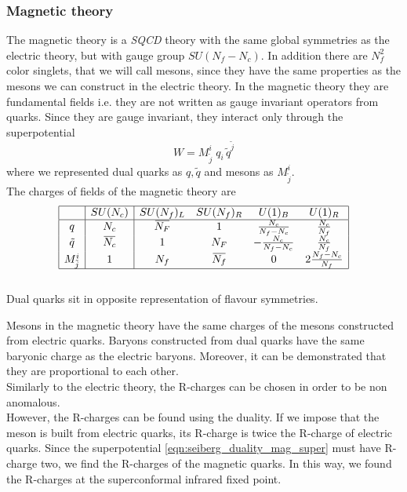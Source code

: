 \subsubsection{Magnetic theory}
The magnetic theory is a \emph{SQCD} theory with the same global symmetries as the electric theory, but with gauge group $SU(N_f - N_c)$. 
In addition there are $N_f^2$ color singlets, that we will call mesons, since they have the same properties as the mesons we can construct in the electric theory.
In the magnetic theory they are fundamental fields i.e. they are not written as gauge invariant operators from quarks. 
Since they are gauge invariant, they interact only through the superpotential
\begin{equation}
 W  = M^i_{\tilde{j}} \; q_i \, \tilde{q}^{\tilde{j}}
 \label{eqn:seiberg_duality_mag_super}
\end{equation}
where we represented dual quarks as $q,\tilde{q}$ and mesons as $M^i_{\tilde{j}} $.\\
The charges of fields of the magnetic theory are
\begin{equation}
 \begin{array}{| c | c |  c c c c |  }
 \hline
 & SU(N_c) & SU(N_f)_L  &SU(N_f)_R   & U(1)_B &  U(1)_R \\
\hline
q & N_c & \overbar{N_F} & 1   &   \frac{N_c}{N_f-N_c}   &  \frac{N_c}{N_f}  \\
\tilde{q} &\overbar{N_c}  &  1 & { N_F}   & - \frac{N_c}{N_f-N_c}   &   \frac{N_c}{N_f}   \\	 
M^i_{\tilde{j}}  &  1  & N_f & \overbar{N_f}  & 0 &  2 \frac{N_f - N_c}{N_f}\\ 
\hline
 \end{array}
 \label{tab:sun_magnetich_charges}
\end{equation}\\
Dual quarks sit in opposite representation of flavour symmetries. 

Mesons in the magnetic theory have the same charges of the mesons constructed from electric quarks.
Baryons constructed from dual quarks have the same baryonic charge as the electric baryons.
Moreover, it can be demonstrated that they are proportional to each other.\\
Similarly to the electric theory, the R-charges can be chosen in order to be non anomalous.\\
However, the R-charges can be found using the duality.
If we impose that the meson is built from electric quarks, its R-charge is twice the R-charge of electric quarks.
Since the superpotential \eqref{eqn:seiberg_duality_mag_super} must have R-charge two, we find the R-charges of the magnetic quarks.
In this way, we found the R-charges at the superconformal infrared fixed point.

